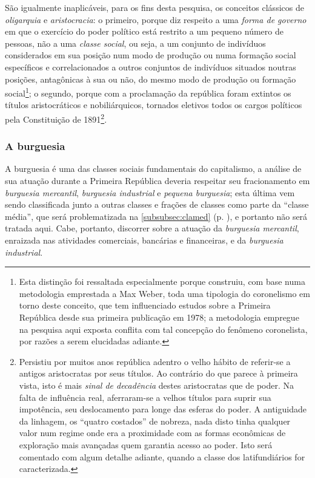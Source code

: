São igualmente inaplicáveis, para os fins desta pesquisa, os conceitos clássicos de \textit{oligarquia} e \textit{aristocracia}: o primeiro, porque diz respeito a uma \textit{forma de governo} em que o exercício do poder político está restrito a um pequeno número de pessoas, não a uma \textit{classe social}, ou seja, a um conjunto de indivíduos considerados em sua posição num modo de produção ou numa formação social específicos e correlacionados a outros conjuntos de indivíduos situados noutras posições, antagônicas à sua ou não, do mesmo modo de produção ou formação social\footnote{Esta distinção foi ressaltada especialmente porque  construiu, com base numa metodologia emprestada a Max Weber, toda uma tipologia do coronelismo em torno deste conceito, que tem influenciado estudos sobre a Primeira República desde sua primeira publicação em 1978; a metodologia empregue na pesquisa aqui exposta conflita com tal concepção do fenômeno coronelista, por razões a serem elucidadas adiante.}; o segundo, porque com a proclamação da república foram extintos os títulos aristocráticos e nobiliárquicos, tornados eletivos todos os cargos políticos pela Constituição de 1891\footnote{Persistiu por muitos anos república adentro o velho hábito de referir-se a antigos aristocratas por seus títulos. Ao contrário do que parece à primeira vista, isto é mais \textit{sinal de decadência} destes aristocratas que de poder. Na falta de influência real, aferraram-se a velhos títulos para suprir sua impotência, seu deslocamento para longe das esferas do poder. A antiguidade da linhagem, os ``quatro costados'' de nobreza, nada disto tinha qualquer valor num regime onde era a proximidade com as formas econômicas de exploração mais avançadas quem garantia acesso ao poder. Isto será comentado com algum detalhe adiante, quando a classe dos latifundiários for caracterizada.}.

\subsubsection{A burguesia}\label{subsubsec:claburg}

A burguesia é uma das classes sociais fundamentais do capitalismo, a análise de sua atuação durante a Primeira República deveria respeitar seu fracionamento em \textit{burguesia mercantil}, \textit{burguesia industrial} e \textit{pequena burguesia}; esta última vem sendo classificada junto a outras classes e frações de classes como parte da ``classe média'', que será problematizada na \autoref{subsubsec:clamed} (p. \pageref{subsubsec:clamed}), e portanto não será tratada aqui. Cabe, portanto, discorrer sobre a atuação da \textit{burguesia mercantil}, enraizada nas atividades comerciais, bancárias e financeiras, e da \textit{burguesia industrial}.

